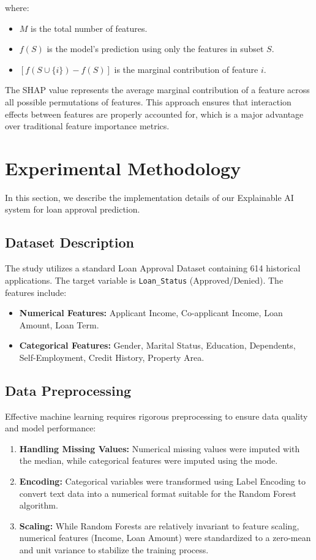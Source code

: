 \documentclass[12pt, a4paper]{article}
\begin{document}
where:
\begin{itemize}
    \item $M$ is the total number of features.
    \item $f(S)$ is the model's prediction using only the features in subset $S$.
    \item $[f(S \cup \{i\}) - f(S)]$ is the marginal contribution of feature $i$.
\end{itemize}

The SHAP value represents the average marginal contribution of a feature across all possible permutations of features. This approach ensures that interaction effects between features are properly accounted for, which is a major advantage over traditional feature importance metrics.

\section{Experimental Methodology}

In this section, we describe the implementation details of our Explainable AI system for loan approval prediction.

\subsection{Dataset Description}

The study utilizes a standard Loan Approval Dataset containing 614 historical applications. The target variable is \texttt{Loan\_Status} (Approved/Denied). The features include:

\begin{itemize}
    \item \textbf{Numerical Features:} Applicant Income, Co-applicant Income, Loan Amount, Loan Term.
    \item \textbf{Categorical Features:} Gender, Marital Status, Education, Dependents, Self-Employment, Credit History, Property Area.
\end{itemize}

\subsection{Data Preprocessing}

Effective machine learning requires rigorous preprocessing to ensure data quality and model performance:

\begin{enumerate}
    \item \textbf{Handling Missing Values:} Numerical missing values were imputed with the median, while categorical features were imputed using the mode.
    \item \textbf{Encoding:} Categorical variables were transformed using Label Encoding to convert text data into a numerical format suitable for the Random Forest algorithm.
    \item \textbf{Scaling:} While Random Forests are relatively invariant to feature scaling, numerical features (Income, Loan Amount) were standardized to a zero-mean and unit variance to stabilize the training process.
\end{enumerate}
\end{document}
